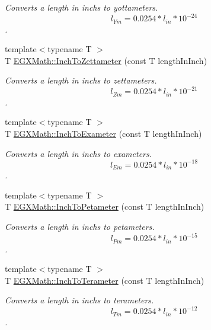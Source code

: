 \begin{DoxyCompactItemize}
\begin{DoxyCompactList}\small\item\em Converts a length in inchs to yottameters. \[ l_{Ym}=0.0254 * l_{in} * 10^{-24} \]. \end{DoxyCompactList}\item 
{\footnotesize template$<$typename T $>$ }\\T \mbox{\hyperlink{group___e_g_x_math-_conversions-_length_conversions-_imperial-_inch-_s_i_ga8d295c602a67bb5218b47d7a6c054243}{E\+G\+X\+Math\+::\+Inch\+To\+Zettameter}} (const T length\+In\+Inch)
\begin{DoxyCompactList}\small\item\em Converts a length in inchs to zettameters. \[ l_{Zm}=0.0254 * l_{in} * 10^{-21} \]. \end{DoxyCompactList}\item 
{\footnotesize template$<$typename T $>$ }\\T \mbox{\hyperlink{group___e_g_x_math-_conversions-_length_conversions-_imperial-_inch-_s_i_ga408aa62c2ee50f560f7ffe178ab0f1de}{E\+G\+X\+Math\+::\+Inch\+To\+Exameter}} (const T length\+In\+Inch)
\begin{DoxyCompactList}\small\item\em Converts a length in inchs to exameters. \[ l_{Em}=0.0254 * l_{in} * 10^{-18} \]. \end{DoxyCompactList}\item 
{\footnotesize template$<$typename T $>$ }\\T \mbox{\hyperlink{group___e_g_x_math-_conversions-_length_conversions-_imperial-_inch-_s_i_gae30ce4093b17aa63cc6d96a035e8dc61}{E\+G\+X\+Math\+::\+Inch\+To\+Petameter}} (const T length\+In\+Inch)
\begin{DoxyCompactList}\small\item\em Converts a length in inchs to petameters. \[ l_{Pm}=0.0254 * l_{in} * 10^{-15} \]. \end{DoxyCompactList}\item 
{\footnotesize template$<$typename T $>$ }\\T \mbox{\hyperlink{group___e_g_x_math-_conversions-_length_conversions-_imperial-_inch-_s_i_ga371a80e6577f6c2ba9101b383b910fad}{E\+G\+X\+Math\+::\+Inch\+To\+Terameter}} (const T length\+In\+Inch)
\begin{DoxyCompactList}\small\item\em Converts a length in inchs to terameters. \[ l_{Tm}=0.0254 * l_{in} * 10^{-12} \]. \end{DoxyCompactList}\item 

\end{DoxyCompactItemize}

